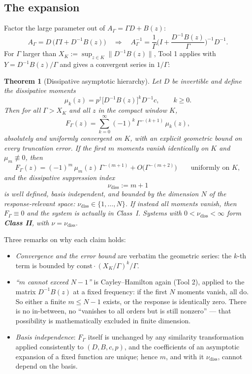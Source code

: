 \documentclass[11pt]{article}
\newtheorem{theorem}{Theorem}
\newcommand{\nudiss}{\nu_{\mathrm{diss}}}
\begin{document}
\subsection{The expansion}

Factor the large parameter out of $A_\Gamma=\Gamma D+B(z)$:
\[
A_\Gamma = D\,\big(\Gamma I + D^{-1}B(z)\big)
\quad\Longrightarrow\quad
A_\Gamma^{-1}
=\frac1\Gamma\Big(I+\frac{D^{-1}B(z)}{\Gamma}\Big)^{-1} D^{-1}.
\]
For $\Gamma$ larger than $X_K:=\sup_{z\in K}\|D^{-1}B(z)\|$, Tool 1 applies
with $Y=D^{-1}B(z)/\Gamma$ and gives a convergent series in $1/\Gamma$:

\begin{theorem}[Dissipative asymptotic hierarchy]
\label{thm:two}
Let $D$ be invertible and define the \emph{dissipative moments}
\[
\mu_k(z)=p^\dagger\big[D^{-1}B(z)\big]^k D^{-1}c,\qquad k\ge0 .
\]
Then for all $\Gamma>X_K$ and all $z$ in the compact window $K$,
\begin{equation}
F_\Gamma(z)=\sum_{k=0}^{\infty}(-1)^k\,\Gamma^{-(k+1)}\,\mu_k(z),
\label{eq:hierarchy}
\end{equation}
absolutely and uniformly convergent on $K$, with an explicit geometric bound
on every truncation error.  If the first $m$ moments vanish identically on
$K$ and $\mu_m\not\equiv0$, then
\[
F_\Gamma(z)=(-1)^m\,\mu_m(z)\,\Gamma^{-(m+1)}+O\!\big(\Gamma^{-(m+2)}\big)
\qquad\text{uniformly on }K,
\]
and the \emph{dissipative suppression index}
\[
\nudiss:=m+1
\]
is well defined, basis independent, and bounded by the dimension $N$ of the
response-relevant space: $\nudiss\in\{1,\dots,N\}$.  If instead \emph{all}
moments vanish, then $F_\Gamma\equiv0$ and the system is actually in
Class~I.  Systems with $0<\nudiss<\infty$ form \textbf{Class II}, with
$\nu=\nudiss$.
\end{theorem}

Three remarks on why each claim holds:
\begin{itemize}
\item \emph{Convergence and the error bound} are verbatim the geometric
series: the $k$-th term is bounded by $\mathrm{const}\cdot(X_K/\Gamma)^k/\Gamma$.
\item \emph{``$m$ cannot exceed $N-1$''} is Cayley--Hamilton again (Tool 2),
applied to the matrix $D^{-1}B(z)$ at a fixed frequency: if the first $N$
moments vanish, all do.  So either a finite $m\le N-1$ exists, or the
response is identically zero.  There is no in-between, no
``vanishes to all orders but is still nonzero'' --- that possibility is
mathematically excluded in finite dimension.
\item \emph{Basis independence}: $F_\Gamma$ itself is unchanged by any
similarity transformation applied consistently to $(D,B,c,p)$, and the
coefficients of an asymptotic expansion of a fixed function are unique;
hence $m$, and with it $\nudiss$, cannot depend on the basis.
\end{itemize}
\end{document}
